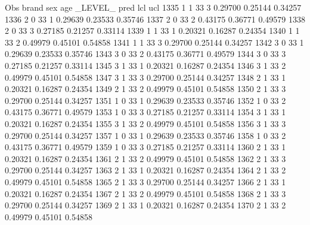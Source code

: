 \documentclass{article}
\begin{document}
\begin{Woutput}
 Obs    brand    sex    age    _LEVEL_      pred       lcl        ucl
1335      1       1      33       3       0.29700    0.25144    0.34257
1336      2       0      33       1       0.29639    0.23533    0.35746
1337      2       0      33       2       0.43175    0.36771    0.49579
1338      2       0      33       3       0.27185    0.21257    0.33114
1339      1       1      33       1       0.20321    0.16287    0.24354
1340      1       1      33       2       0.49979    0.45101    0.54858
1341      1       1      33       3       0.29700    0.25144    0.34257
1342      3       0      33       1       0.29639    0.23533    0.35746
1343      3       0      33       2       0.43175    0.36771    0.49579
1344      3       0      33       3       0.27185    0.21257    0.33114
1345      3       1      33       1       0.20321    0.16287    0.24354
1346      3       1      33       2       0.49979    0.45101    0.54858
1347      3       1      33       3       0.29700    0.25144    0.34257
1348      2       1      33       1       0.20321    0.16287    0.24354
1349      2       1      33       2       0.49979    0.45101    0.54858
1350      2       1      33       3       0.29700    0.25144    0.34257
1351      1       0      33       1       0.29639    0.23533    0.35746
1352      1       0      33       2       0.43175    0.36771    0.49579
1353      1       0      33       3       0.27185    0.21257    0.33114
1354      3       1      33       1       0.20321    0.16287    0.24354
1355      3       1      33       2       0.49979    0.45101    0.54858
1356      3       1      33       3       0.29700    0.25144    0.34257
1357      1       0      33       1       0.29639    0.23533    0.35746
1358      1       0      33       2       0.43175    0.36771    0.49579
1359      1       0      33       3       0.27185    0.21257    0.33114
1360      2       1      33       1       0.20321    0.16287    0.24354
1361      2       1      33       2       0.49979    0.45101    0.54858
1362      2       1      33       3       0.29700    0.25144    0.34257
1363      2       1      33       1       0.20321    0.16287    0.24354
1364      2       1      33       2       0.49979    0.45101    0.54858
1365      2       1      33       3       0.29700    0.25144    0.34257
1366      2       1      33       1       0.20321    0.16287    0.24354
1367      2       1      33       2       0.49979    0.45101    0.54858
1368      2       1      33       3       0.29700    0.25144    0.34257
1369      2       1      33       1       0.20321    0.16287    0.24354
1370      2       1      33       2       0.49979    0.45101    0.54858

\end{Woutput}
\end{document}
